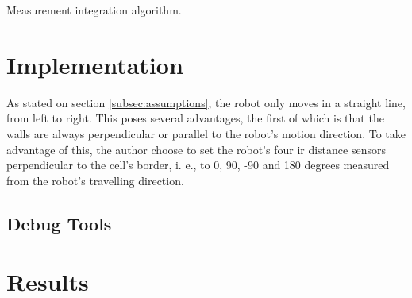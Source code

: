 \documentclass[runningheads]{llncs}
\begin{document}
\begin{algorithm}[!ht]
    \DontPrintSemicolon



\caption{Measurement integration algorithm.}
\label{alg:bayes_sense}
\end{algorithm}
\FloatBarrier



\section{Implementation}
\label{sec:implementation}

As stated on section \ref{subsec:assumptions}, the robot only moves in a straight line, from left to right. This poses several advantages, the first of which is that the walls are always perpendicular or parallel to the robot's motion direction. To take advantage of this, the author choose to set the robot's four \gls{ir} distance sensors perpendicular to the cell's border, i. e., to 0, 90, -90 and 180 degrees measured from the robot's travelling direction.










\subsection{Debug Tools}
\label{subsec:debug_tools}





\section{Results}
\label{sec:results}
\end{document}
